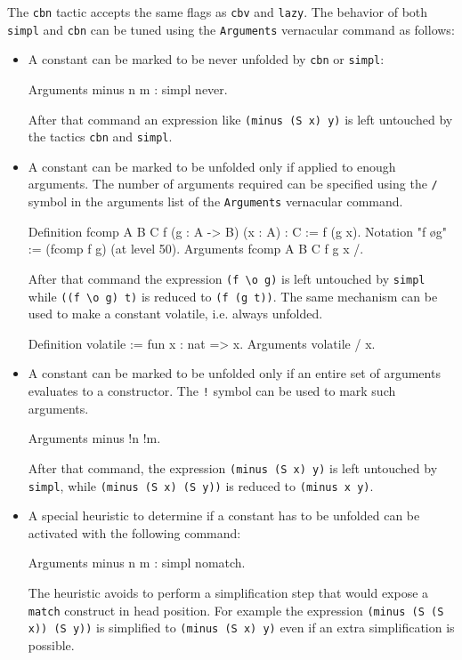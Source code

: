 \begin{coq_example*}
The \texttt{cbn} tactic accepts the same flags as \texttt{cbv} and
\texttt{lazy}.  The behavior of both \texttt{simpl} and \texttt{cbn}
can be tuned using the \texttt{Arguments} vernacular command as
follows: 
\begin{itemize}
\item
A constant can be marked to be never unfolded by \texttt{cbn} or
\texttt{simpl}:
\begin{coq_example*}
Arguments minus n m : simpl never.
\end{coq_example*}
After that command an expression like \texttt{(minus (S x) y)} is left
untouched by the tactics \texttt{cbn} and \texttt{simpl}.
\item
A constant can be marked to be unfolded only if applied to enough arguments.
The number of arguments required can be specified using
the {\tt /} symbol in the arguments list of the {\tt Arguments} vernacular
command.
\begin{coq_example*}
Definition fcomp A B C f (g : A -> B) (x : A) : C := f (g x).
Notation "f \o g" := (fcomp f g) (at level 50).
Arguments fcomp {A B C} f g x /.
\end{coq_example*}
After that command the expression {\tt (f \verb+\+o g)} is left untouched by
{\tt simpl} while {\tt ((f \verb+\+o g) t)} is reduced to {\tt (f (g t))}.
The same mechanism can be used to make a constant volatile, i.e. always
unfolded.
\begin{coq_example*}
Definition volatile := fun x : nat => x.
Arguments volatile / x.
\end{coq_example*}
\item
A constant can be marked to be unfolded only if an entire set of arguments
evaluates to a constructor. The {\tt !} symbol can be used to mark such
arguments.
\begin{coq_example*}
Arguments minus !n !m.
\end{coq_example*}
After that command, the expression {\tt (minus (S x) y)} is left untouched by
{\tt simpl}, while {\tt (minus (S x) (S y))} is reduced to {\tt (minus x y)}.
\item
A special heuristic to determine if a constant has to be unfolded can be
activated with the following command:
\begin{coq_example*}
Arguments minus n m : simpl nomatch.
\end{coq_example*}
The heuristic avoids to perform a simplification step that would
expose a {\tt match} construct in head position. For example the
expression {\tt (minus (S (S x)) (S y))} is simplified to
{\tt (minus (S x) y)} even if an extra simplification is possible.
\end{itemize}


\end{coq_example*}
